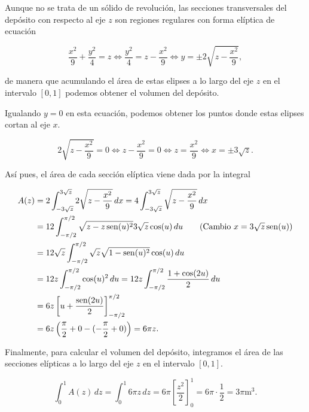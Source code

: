 \documentclass[
  spanish,
  a4paper,
]{scrreport}
\theoremstyle{definition}
\theoremstyle{remark}
\begin{document}
\begin{tcolorbox}[enhanced jigsaw, arc=.35mm, bottomrule=.15mm, bottomtitle=1mm, breakable, colback=white, colbacktitle=quarto-callout-tip-color!10!white, colframe=quarto-callout-tip-color-frame, coltitle=black, left=2mm, leftrule=.75mm, opacityback=0, opacitybacktitle=0.6, rightrule=.15mm, title=\textcolor{quarto-callout-tip-color}{\faLightbulb}\hspace{0.5em}{Solución}, titlerule=0mm, toprule=.15mm, toptitle=1mm]

Aunque no se trata de un sólido de revolución, las secciones
transversales del depósito con respecto al eje \(z\) son regiones
regulares con forma elíptica de ecuación

\[
\frac{x^2}{9} + \frac{y^2}{4} = z 
\Leftrightarrow \frac{y^2}{4} = z - \frac{x^2}{9}
\Leftrightarrow y = \pm 2\sqrt{z - \frac{x^2}{9}},
\]

de manera que acumulando el área de estas elipses a lo largo del eje
\(z\) en el intervalo \([0,1]\) podemos obtener el volumen del depósito.

Igualando \(y=0\) en esta ecuación, podemos obtener los puntos donde
estas elipses cortan al eje \(x\).

\[
2\sqrt{z - \frac{x^2}{9}} = 0 
\Leftrightarrow z - \frac{x^2}{9} = 0 
\Leftrightarrow z = \frac{x^2}{9}
\Leftrightarrow x = \pm 3\sqrt{z}.
\]

Así pues, el área de cada sección elíptica viene dada por la integral

\begin{align*}
A(z) 
&= 2\int_{-3\sqrt{z}}^{3\sqrt{z}} 2\sqrt{z - \frac{x^2}{9}}\,dx 
= 4\int_{-3\sqrt{z}}^{3\sqrt{z}} \sqrt{z - \frac{x^2}{9}}\,dx \\
&= 12 \int_{-\pi/2}^{\pi/2} \sqrt{z - z\operatorname{sen}(u)^2} 3\sqrt{z}\cos(u)\,du \tag{Cambio $x=3\sqrt{z}\operatorname{sen}(u)$}\\
&= 12\sqrt{z} \int_{-\pi/2}^{\pi/2} \sqrt{z}\sqrt{1 - \operatorname{sen}(u)^2}\cos(u)\,du \\
&= 12z \int_{-\pi/2}^{\pi/2} \cos(u)^2\,du
= 12z \int_{-\pi/2}^{\pi/2} \frac{1 + \cos(2u)}{2}\,du \\
&= 6z \left[ u + \frac{\operatorname{sen}(2u)}{2} \right]_{-\pi/2}^{\pi/2} \\
&= 6z \left( \frac{\pi}{2} + 0 - (-\frac{\pi}{2} + 0) \right)
= 6\pi z.
\end{align*}

Finalmente, para calcular el volumen del depósito, integramos el área de
las secciones elípticas a lo largo del eje \(z\) en el intervalo
\([0,1]\).

\[
\int_0^1 A(z)\,dz 
= \int_0^1 6\pi z\,dz 
= 6\pi \left[ \frac{z^2}{2} \right]_0^1
= 6\pi \cdot \frac{1}{2}
= 3\pi \mbox{m}^3.
\]

\end{tcolorbox}
\end{document}
